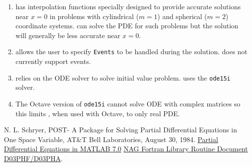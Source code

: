 \documentclass{article}
\begin{document}
\begin{enumerate}
\item
\pdepe has interpolation functions specially designed to provide accurate solutions near $x=0$
in problems with cylindrical ($m=1$) and spherical ($m=2$) coordinate systems. \pde can solve
the PDE for such problems but the solution will generally be less accurate near $x=0$.
\item
\pdepe allows the user to specify {\tt Events} to be handled during the solution. \pde does not currently support events.
\item
\pdepe relies on the  ODE solver to solve initial value problem. \pde uses the {\tt ode15i} solver.
\item 
The Octave version of {\tt ode15i} cannot solve ODE with complex matrices so this limits
\pde, when used with Octave, to only real PDE.
\end{enumerate}

\begin{thebibliography}{99}
 N. L. Schryer, POST- A Package for Solving Partial
Differential Equations in One Space Variable, AT\&T Bell Laboratories,
August 30, 1984.
\href{https://www.math.tamu.edu/~phoward/m401/pdemat.pdf}
{Partial Differential Equations in MATLAB 7.0}
\href{https://www.nag.co.uk/numeric/fl/manual/pdf/D03/d03phf.pdf}
{NAG Fortran Library Routine Document D03PHF/D03PHA}.
\end{thebibliography}
\end{document}
